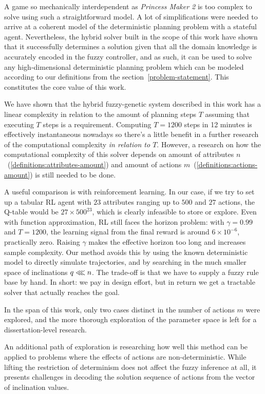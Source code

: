 \documentclass[12pt, a4paper]{report}
\begin{document}
	A game so mechanically interdependent as \textit{Princess Maker 2} is too complex to solve using such a straightforward model.
	A lot of simplifications were needed to arrive at a coherent model of the deterministic planning problem with a stateful agent.
	Nevertheless, the hybrid solver built in the scope of this work have shown that it successfully determines a solution given that all the domain knowledge is accurately encoded in the fuzzy controller, and as such, it can be used to solve any high-dimensional deterministic planning problem which can be modeled according to our definitions from the section~\ref{problem-statement}.
	This constitutes the core value of this work.
	
	We have shown that the hybrid fuzzy-genetic system described in this work has a linear complexity in relation to the amount of planning steps $T$ assuming that executing $T$ steps is a requirement.
	Computing $T=1200$ steps in 12 minutes is effectively instantaneous nowadays so there's a little benefit in a further research of the computational complexity \textit{in relation to $T$}.
	However, a research on how the computational complexity of this solver depends on amount of attributes $n$~(\ref{definitions:attributes-amount}) and amount of actions $m$~(\ref{definitions:actions-amount}) is still needed to be done.


A useful comparison is with reinforcement learning. 
In our case, if we try to set up a tabular RL agent with $23$ attributes ranging up to $500$ and $27$ actions, the Q-table would be $27 \times 500^{23}$, which is clearly infeasible to store or explore.
Even with function approximation, RL still faces the horizon problem: with $\gamma = 0.99$ and $T = 1200$, the learning signal from the final reward is around $6 \times 10^{-6}$, practically zero.
Raising $\gamma$ makes the effective horizon too long and increases sample complexity.
Our method avoids this by using the known deterministic model to directly simulate trajectories, and by searching in the much smaller space of inclinations $q \llless n$. 
The trade-off is that we have to supply a fuzzy rule base by hand.
In short: we pay in design effort, but in return we get a tractable solver that actually reaches the goal.

	In the span of this work, only two cases distinct in the number of actions $m$ were explored, and the more thorough exploration of the parameter space is left for a dissertation-level research.
	
	An additional path of exploration is researching how well this method can be applied to problems where the effects of actions are non-deterministic.
	While lifting the restriction of determinism does not affect the fuzzy inference at all, it presents challenges in decoding the solution sequence of actions from the vector of inclination values.
	
\end{document}
